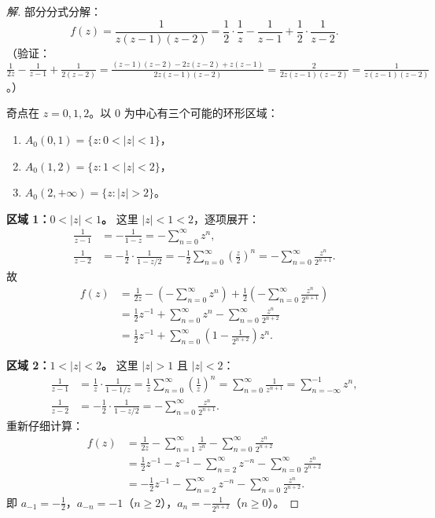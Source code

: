 \documentclass[11pt,a4paper]{article}
\theoremstyle{definition}
\newenvironment{solution}{\begin{proof}[解]}{\end{proof}}
\begin{document}
\begin{solution}
  部分分式分解：
  \[
    f(z) = \frac{1}{z(z-1)(z-2)} = \frac{1}{2} \cdot \frac{1}{z}
    - \frac{1}{z-1} + \frac{1}{2} \cdot \frac{1}{z-2}.
  \]
  （验证：$\frac{1}{2z} - \frac{1}{z-1} + \frac{1}{2(z-2)} = \frac{(z-1)(z-2) - 2z(z-2) + z(z-1)}{2z(z-1)(z-2)} = \frac{2}{2z(z-1)(z-2)} = \frac{1}{z(z-1)(z-2)}$。）

  奇点在 $z = 0, 1, 2$。以 $0$ 为中心有三个可能的环形区域：
  \begin{enumerate}
    \item $A_0(0, 1) = \{z : 0 < |z| < 1\}$，
    \item $A_0(1, 2) = \{z : 1 < |z| < 2\}$，
    \item $A_0(2, +\infty) = \{z : |z| > 2\}$。
  \end{enumerate}

  \medskip
  \noindent\textbf{区域 1：$0 < |z| < 1$。}
  这里 $|z| < 1 < 2$，逐项展开：
  \begin{align*}
    \frac{1}{z-1} &= -\frac{1}{1-z} = -\sum_{n=0}^{\infty} z^n,\\
    \frac{1}{z-2} &= -\frac{1}{2} \cdot \frac{1}{1 - z/2}
    = -\frac{1}{2} \sum_{n=0}^{\infty} \left(\frac{z}{2}\right)^n
    = -\sum_{n=0}^{\infty} \frac{z^n}{2^{n+1}}.
  \end{align*}
  故
  \begin{align*}
    f(z) &= \frac{1}{2z} - \left(-\sum_{n=0}^{\infty} z^n\right)
    + \frac{1}{2}\left(-\sum_{n=0}^{\infty} \frac{z^n}{2^{n+1}}\right)\\
    &= \frac{1}{2} z^{-1} + \sum_{n=0}^{\infty} z^n
    - \sum_{n=0}^{\infty} \frac{z^n}{2^{n+2}}\\
    &= \frac{1}{2} z^{-1} + \sum_{n=0}^{\infty}
    \left(1 - \frac{1}{2^{n+2}}\right) z^n.
  \end{align*}

  \medskip
  \noindent\textbf{区域 2：$1 < |z| < 2$。}
  这里 $|z| > 1$ 且 $|z| < 2$：
  \begin{align*}
    \frac{1}{z-1} &= \frac{1}{z} \cdot \frac{1}{1 - 1/z}
    = \frac{1}{z} \sum_{n=0}^{\infty} \left(\frac{1}{z}\right)^n
    = \sum_{n=0}^{\infty} \frac{1}{z^{n+1}} = \sum_{n=-\infty}^{-1} z^n,\\
    \frac{1}{z-2} &= -\frac{1}{2} \cdot \frac{1}{1 - z/2}
    = -\sum_{n=0}^{\infty} \frac{z^n}{2^{n+1}}.
  \end{align*}
  重新仔细计算：
  \begin{align*}
    f(z) &= \frac{1}{2z} - \sum_{n=1}^{\infty} \frac{1}{z^n}
    - \sum_{n=0}^{\infty} \frac{z^n}{2^{n+2}}\\
    &= \frac{1}{2}z^{-1} - z^{-1} - \sum_{n=2}^{\infty} z^{-n}
    - \sum_{n=0}^{\infty} \frac{z^n}{2^{n+2}}\\
    &= -\frac{1}{2}z^{-1} - \sum_{n=2}^{\infty} z^{-n}
    - \sum_{n=0}^{\infty} \frac{z^n}{2^{n+2}}.
  \end{align*}
  即 $a_{-1} = -\frac{1}{2}$，$a_{-n} = -1$（$n \ge 2$），$a_n = -\frac{1}{2^{n+2}}$（$n \ge 0$）。


\end{solution}
\end{document}

